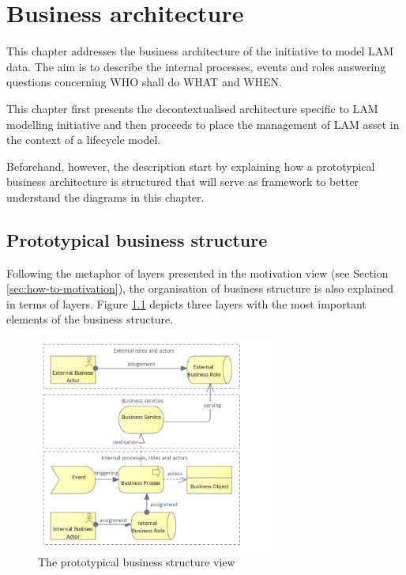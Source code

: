 \chapter{Business architecture}
\label{sec:business-architecture}
	
	This chapter addresses the business architecture of the initiative to model LAM data. The aim is to describe the internal processes, events and roles answering questions concerning WHO shall do WHAT and WHEN.
	
	This chapter first presents the decontextualised architecture specific to LAM modelling initiative and then proceeds to place the management of LAM asset in the context of a lifecycle model.
	
	Beforehand, however, the description start by explaining how a prototypical business architecture is structured that will serve as framework to better understand the diagrams in this chapter.
	
	\section{Prototypical business structure}
	
	Following the metaphor of layers presented in the motivation view (see Section \ref{sec:how-to-motivation}), the organisation of business structure is also explained in terms of layers. Figure \ref{fig:business-structure-protopypical} depicts three layers with the most important elements of the business structure. 
	
	\begin{figure}[h]
		\centering
		\includegraphics[width=0.7\textwidth]{images/views/Business view.png}
		\caption{The prototypical business structure view}
		\label{fig:business-structure-protopypical}
	\end{figure} 
	
